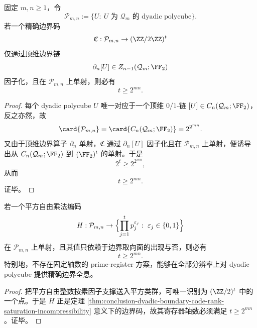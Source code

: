\begin{theorem}[顶维边界码的秩饱和不可压缩性]\label{thm:conclusion-dyadic-boundary-code-rank-saturation-incompressibility}
固定 \(m,n\ge 1\)，令
\[
\mathcal P_{m,n}
:=
\{U:\ U\text{ 为 }\mathcal Q_m\text{ 的 dyadic polycube}\}.
\]
若一个精确边界码
\[
\mathfrak C:\mathcal P_{m,n}\to (\ZZ/2\ZZ)^t
\]
仅通过顶维边界链
\[
\partial_n[U]\in Z_{n-1}(\mathcal Q_m;\FF_2)
\]
因子化，且在 \(\mathcal P_{m,n}\) 上单射，则必有
\[
t\ge 2^{mn}.
\]
\end{theorem}
\begin{proof}
每个 dyadic polycube \(U\) 唯一对应于一个顶维 \(0/1\)-链
\(
[U]\in C_n(\mathcal Q_m;\FF_2)
\)，反之亦然，故
\[
\card{\mathcal P_{m,n}}
=
\card{C_n(\mathcal Q_m;\FF_2)}
=
2^{2^{mn}}.
\]
又由于顶维边界算子 \(\partial_n\) 单射，\(\mathfrak C\) 通过 \(\partial_n[U]\) 因子化且在 \(\mathcal P_{m,n}\) 上单射，便诱导出从 \(C_n(\mathcal Q_m;\FF_2)\) 到 \((\FF_2)^t\) 的单射。于是
\[
2^t\ge 2^{2^{mn}},
\]
从而
\[
t\ge 2^{mn}.
\]
证毕。
\end{proof}

\begin{corollary}\label{cor:conclusion-dyadic-boundary-squarefree-prime-register-exponential-lower-bound}
若一个平方自由乘法编码
\[
H:\mathcal P_{m,n}\to \Bigl\{\prod_{j=1}^t p_j^{\varepsilon_j}:\ \varepsilon_j\in\{0,1\}\Bigr\}
\]
在 \(\mathcal P_{m,n}\) 上单射，且其值只依赖于边界取向面的出现与否，则必有
\[
t\ge 2^{mn}.
\]
特别地，不存在固定轴数的 prime-register 方案，能够在全部分辨率上对 dyadic polycube 提供精确边界全息。
\end{corollary}
\begin{proof}
把平方自由整数按素因子支撑送入平方类群，可唯一识别为 \((\ZZ/2)^t\) 中的一个点。于是 \(H\) 正是定理 \ref{thm:conclusion-dyadic-boundary-code-rank-saturation-incompressibility} 意义下的边界码，故其寄存器轴数必须满足 \(t\ge 2^{mn}\)。证毕。
\end{proof}

